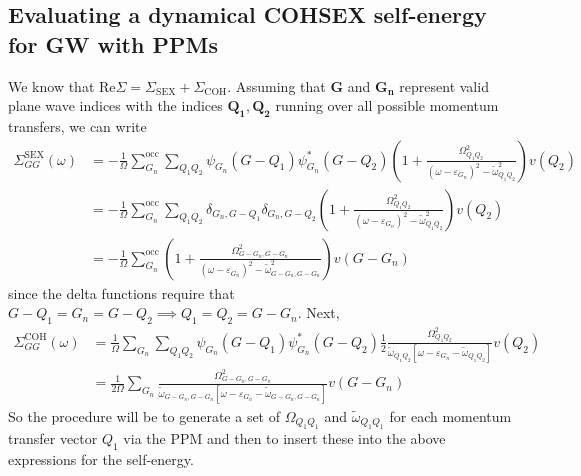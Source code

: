 \subsection{Evaluating a dynamical COHSEX self-energy for GW with PPMs}
We know that $\mathrm{Re} \Sigma=\Sigma_{\mathrm{SEX}}+\Sigma_{\mathrm{COH}}$. Assuming that $\bm{G}$ and $\bm{G_n}$ represent valid plane wave indices with the indices $\bm{Q_1},\bm{Q_2}$ running over all possible momentum transfers, we can write
\begin{align}
\Sigma_{G G}^{\mathrm{SEX}}(\omega ) & =-\frac{1}{\Omega} \sum_{G_n}^{\mathrm{occ}} \sum_{Q_1 Q_2} \psi_{G_n} (G-Q_1) \psi_{G_n}^* (G-Q_2) \left(1+\frac{\Omega_{Q_1 Q_2}^2}{\left(\omega-\varepsilon_{G_n}\right)^2-\tilde{\omega}_{Q_1 Q_2}^2}\right) v\left(Q_2\right) \\
&= -\frac{1}{\Omega} \sum_{G_n}^{\mathrm{occ}} \sum_{Q_1Q_2} \delta_{G_n, G-Q_1} \delta_{G_n, G-Q_2} \left(1+\frac{\Omega_{Q_1 Q_2}^2}{\left(\omega-\varepsilon_{G_n}\right)^2-\tilde{\omega}_{Q_1 Q_2}^2}\right) v\left(Q_2\right) \\
&= -\frac{1}{\Omega} \sum_{G_n}^{\mathrm{occ}} \left(1+\frac{\Omega_{G-G_n, G-G_n}^2}{\left(\omega-\varepsilon_{G_n}\right)^2-\tilde{\omega}_{G-G_n, G-G_n}^2}\right) v\left(G-G_n\right)
\end{align}
since the delta functions require that $G-Q_1=G_n=G-Q_2\implies Q_1=Q_2=G-G_n$. Next,
\begin{align}
\Sigma_{G G}^{\mathrm{COH}}(\omega ) & =\frac{1}{\Omega} \sum_{G_n} \sum_{Q_1 Q_2} \psi_{G_n} (G-Q_1) \psi_{G_n}^* (G-Q_2) \frac{1}{2} \frac{\Omega_{Q_1 Q_2}^2}{\tilde{\omega}_{Q_1 Q_2}\left[\omega-\varepsilon_{G_n}-\tilde{\omega}_{Q_1 Q_2}\right]} v\left(Q_2\right) \\
&= \frac{1}{2\Omega} \sum_{G_n}  \frac{\Omega_{G-G_n, G-G_n}^2}{\tilde{\omega}_{G-G_n, G-G_n}\left[\omega-\varepsilon_{G_n}-\tilde{\omega}_{G-G_n, G-G_n}\right]} v\left(G-G_n\right)
\end{align}
So the procedure will be to generate a set of $\Omega_{Q_1 Q_1}$ and $\tilde{\omega}_{Q_1 Q_1}$ for each momentum transfer vector $Q_1$ via the PPM and then to insert these into the above expressions for the self-energy.
